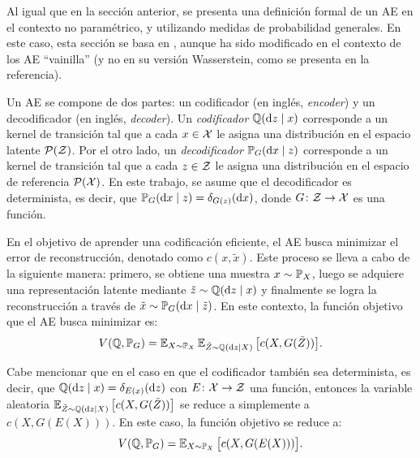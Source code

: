 Al igual que en la sección anterior, se presenta una definición formal de un AE en el contexto no paramétrico, y utilizando medidas de probabilidad generales. En este caso, esta sección se basa en \cite{tolstikhin2017wasserstein}, aunque ha sido modificado en el contexto de los AE ``vainilla'' (y no en su versión Wasserstein, como se presenta en la referencia).

Un AE se compone de dos partes: un codificador (en inglés, \textit{encoder}) y un decodificador (en inglés, \textit{decoder}).
Un \textit{codificador} $ \ProbQ(\dz \mid x)$ corresponde a un kernel de transición tal que a cada $x \in \cX$ le asigna una distribución en el espacio latente $ \ProbSpace[\cZ] $.
Por el otro lado, un \textit{decodificador} $\Prob_G(\dx \mid z)$ corresponde a un kernel de transición tal que a cada $z \in \cZ$ le asigna una distribución en el espacio de referencia $\ProbSpace[\cX]$.
En este trabajo, se asume que el decodificador es determinista, es decir, que $\Prob_G(\dx \mid z) = \delta_{G(z)}(\dx)$, donde $G\colon \cZ \to \cX$ es una función.

En el objetivo de aprender una codificación eficiente, el AE busca minimizar el error de reconstrucción, denotado como $c(x, \tilde x)$. Este proceso se lleva a cabo de la siguiente manera: primero, se obtiene una muestra $x\sim \Prob_X$, luego se adquiere una representación latente mediante $\tilde z \sim \ProbQ(\dz \mid x)$ y finalmente se logra la reconstrucción a través de $\tilde x \sim \Prob_G(\dx \mid \tilde z)$. En este contexto, la función objetivo que el AE busca minimizar es:
\begin{equation}\label{eq:ae-obj-func}
    V(\ProbQ, \Prob_G) = \Exp_{X \sim \Prob_X} \Exp_{\tilde Z \sim \ProbQ(\dz \mid X)} \qty\big[ c(X, G(\tilde Z)) ].
\end{equation}

Cabe mencionar que en el caso en que el codificador también sea determinista, es decir, que $\ProbQ(\dz \mid x) = \delta_{E(x)}(\dz)$ con $E\colon \cX \to \cZ$ una función, entonces la variable aleatoria
$\Exp_{\tilde Z \sim \ProbQ(\dz \mid X)} \qty\big[ c(X, G(\tilde Z)) ]$ se reduce a simplemente a $c(X, G(E(X)))$. En este caso, la función objetivo se reduce a:
\begin{equation}\label{eq:ae-obj-func-deterministic}
    V(\ProbQ, \Prob_G) = \Exp_{X \sim \Prob_X} \qty\big[ c(X, G(E(X))) ].
\end{equation}

